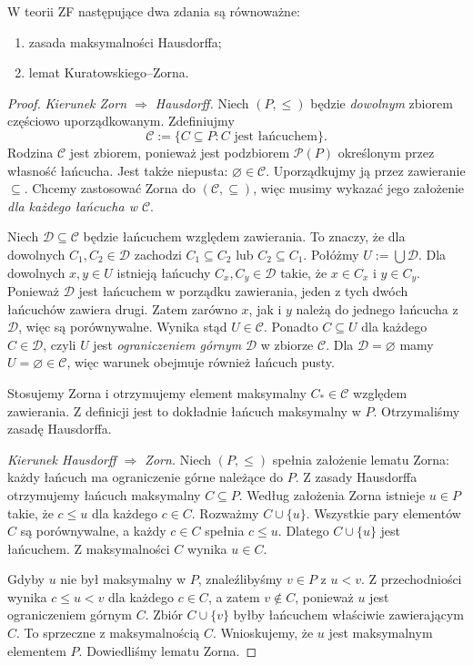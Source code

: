 \begin{twierdzenie}\label{thm:hausdorff-zorn-equivalent}
W teorii ZF następujące dwa zdania są równoważne:
\begin{enumerate}[label=(\roman*)]
\item zasada maksymalności Hausdorffa;
\item lemat Kuratowskiego--Zorna.
\end{enumerate}
\end{twierdzenie}
\begin{proof}
\emph{Kierunek Zorn $\Rightarrow$ Hausdorff.}
Niech $(P,\le)$ będzie \emph{dowolnym} zbiorem
częściowo uporządkowanym. Zdefiniujmy
\[
\mathcal C:=\{C\subseteq P:C\text{ jest łańcuchem}\}.
\]
Rodzina $\mathcal C$ jest zbiorem, ponieważ jest podzbiorem
$\mathcal P(P)$ określonym przez własność łańcucha.
Jest także niepusta: $\varnothing\in\mathcal C$.
Uporządkujmy ją przez zawieranie $\subseteq$.
Chcemy zastosować Zorna do $(\mathcal C,\subseteq)$,
więc musimy wykazać jego założenie \emph{dla każdego
łańcucha w $\mathcal C$}.

Niech $\mathcal D\subseteq\mathcal C$ będzie łańcuchem
względem zawierania. To znaczy, że dla dowolnych
$C_1,C_2\in\mathcal D$ zachodzi
$C_1\subseteq C_2$ lub $C_2\subseteq C_1$.
Połóżmy $U:=\bigcup\mathcal D$.
Dla dowolnych $x,y\in U$ istnieją łańcuchy
$C_x,C_y\in\mathcal D$ takie, że $x\in C_x$ i $y\in C_y$.
Ponieważ $\mathcal D$ jest łańcuchem w porządku zawierania,
jeden z tych dwóch łańcuchów zawiera drugi.
Zatem zarówno $x$, jak i $y$ należą do jednego
łańcucha z $\mathcal D$, więc są porównywalne.
Wynika stąd $U\in\mathcal C$.
Ponadto $C\subseteq U$ dla każdego $C\in\mathcal D$,
czyli $U$ jest \emph{ograniczeniem górnym} $\mathcal D$
w zbiorze $\mathcal C$. Dla $\mathcal D=\varnothing$
mamy $U=\varnothing\in\mathcal C$, więc warunek
obejmuje również łańcuch pusty.

Stosujemy Zorna i otrzymujemy element
maksymalny $C_\ast\in\mathcal C$ względem zawierania.
Z definicji jest to dokładnie łańcuch maksymalny
w $P$. Otrzymaliśmy zasadę Hausdorffa.

\emph{Kierunek Hausdorff $\Rightarrow$ Zorn.}
Niech $(P,\le)$ spełnia założenie lematu Zorna:
każdy łańcuch ma ograniczenie górne należące do $P$.
Z zasady Hausdorffa otrzymujemy łańcuch maksymalny
$C\subseteq P$. Według założenia Zorna istnieje
$u\in P$ takie, że $c\le u$ dla każdego $c\in C$.
Rozważmy $C\cup\{u\}$.
Wszystkie pary elementów $C$ są porównywalne,
a każdy $c\in C$ spełnia $c\le u$.
Dlatego $C\cup\{u\}$ jest łańcuchem.
Z maksymalności $C$ wynika $u\in C$.

Gdyby $u$ nie był maksymalny w $P$, znaleźlibyśmy
$v\in P$ z $u<v$. Z przechodniości wynika
$c\le u<v$ dla każdego $c\in C$, a zatem
$v\notin C$, ponieważ $u$ jest ograniczeniem górnym $C$.
Zbiór $C\cup\{v\}$ byłby łańcuchem właściwie
zawierającym $C$. To sprzeczne z maksymalnością $C$.
Wnioskujemy, że $u$ jest maksymalnym elementem $P$.
Dowiedliśmy lematu Zorna.
\end{proof}

